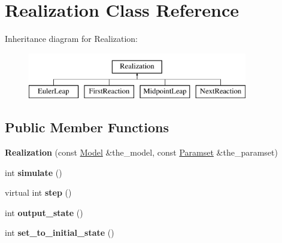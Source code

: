\hypertarget{class_realization}{}\section{Realization Class Reference}
\label{class_realization}
Inheritance diagram for Realization\+:\begin{figure}[H]
\begin{center}
\leavevmode
\includegraphics[height=2.000000cm]{class_realization}
\end{center}
\end{figure}
\subsection*{Public Member Functions}
\begin{DoxyCompactItemize}
\item 
\mbox{\label{class_realization_a599b405e69cc9dd43fc66b9b58a41ba8}} 
{\bfseries Realization} (const \hyperlink{class_model}{Model} \&the\+\_\+model, const \hyperlink{class_paramset}{Paramset} \&the\+\_\+paramset)
\item 
\mbox{\label{class_realization_aa8516a01a8e87ca4748ea2f43ebd6b60}} 
int {\bfseries simulate} ()
\item 
\mbox{\label{class_realization_a74f7b9164e136edd4f2e446d267da56b}} 
virtual int {\bfseries step} ()
\item 
\mbox{\label{class_realization_a0856e7aef37514c6ae1b685e6a436a38}} 
int {\bfseries output\+\_\+state} ()
\item 
\mbox{\label{class_realization_a24f8262338aa96a742ffc76f4128c2dd}} 
int {\bfseries set\+\_\+to\+\_\+initial\+\_\+state} ()
\end{DoxyCompactItemize}
